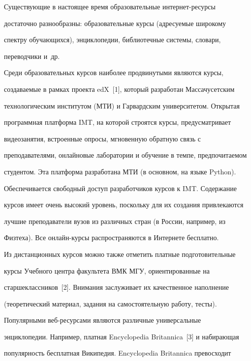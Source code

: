   Существующие в настоящее время образовательные ин\-тер\-нет-ре\-сур\-сы


достаточно разнообразны: образовательные курсы (адресуемые широкому


спектру обучающихся), энциклопедии, библиотечные системы, словари,


переводчики и~др.





  Среди образовательных курсов наиболее продвинутыми являются курсы,


создаваемые в рамках проекта edX~[1], который разработан Массачусетским


технологическим институтом (МТИ) и Гарвардским университетом. Открытая


программная платформа IMT, на которой строятся курсы, предусматривает


видеозанятия, встроенные опросы, мгновенную обратную связь с


преподавателями, онлайновые лаборатории и обучение в темпе, предпочитаемом


студентом. Эта платформа разработана МТИ (в основном, на языке Python).


Обеспечивается свободный доступ разработчиков курсов к IMT. Содержание


курсов имеет очень высокий уровень, поскольку для их создания привлекаются


лучшие преподаватели вузов из различных стран (в России, например, из


Физтеха). Все он\-лайн-кур\-сы распространяются в Интернете бесплатно.





  Из дистанционных курсов можно также отметить платные подготовительные


курсы Учебного центра факультета ВМК МГУ, ориентированные на


стар\-ше\-клас\-сни\-ков~[2]. Внимания заслуживает их качественное наполнение


(теоретический материал, задания на самостоятельную работу, тесты).





  Популярными веб-ресурсами являются различные универсальные


энциклопедии. Например, платная Encyclopedia Britannica~[3] и набирающая


популярность бесплатная Википедия. Encyclopedia Britannica превосходит


